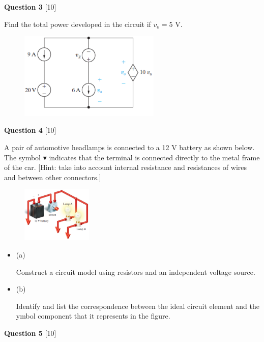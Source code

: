 \documentclass[12pt]{article}
\newcommand{\bit}{\begin{itemize}}
\newcommand{\eit}{\end{itemize}}
\begin{document}
\vspace{0.1in}
\noindent
{\bf Question 3} [10] %

Find the total power developed in the circuit if $v_{o} = 5$ V.
\begin{figure}[h!]
     \centering
     \includegraphics[clip,width=0.6\textwidth]{P2-9.png}
\end{figure}
 

\vspace{0.1in}
\noindent
{\bf Question 4} [10] %

A pair of automotive headlamps is connected to a 12 V battery as shown below. The symbol $\blacktriangledown$ indicates that the terminal is connected directly to the metal frame of the car. [Hint: take into account internal resistance and resistances of wires and between other connectors.]
\begin{figure}[h!]
  \centering 
  \includegraphics[clip,width=0.3\textwidth]{P2-13.png}
\end{figure}

\bit

\item[(a)]

Construct a circuit model using resistors and an independent voltage source. 

\item[(b)]

Identify and list the correspondence between the ideal circuit element and the ymbol component that it represents in the figure.

\eit


\vspace{0.1in}
\noindent
{\bf Question 5} [10] %
\end{document}
